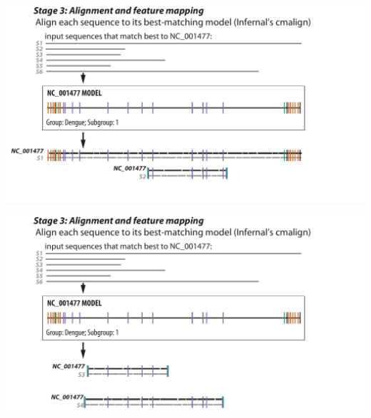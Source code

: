 \documentclass[landscape]{slides}
\begin{document}
\begin{slide}
\begin{center}

\includegraphics[width=10.5in]{figs/v-annotate-stage3-1}
\end{center}

\vfill
\end{slide}
\begin{slide}
\begin{center}

\includegraphics[width=10.5in]{figs/v-annotate-stage3-2}
\end{center}

\vfill
\end{slide}
\end{document}
